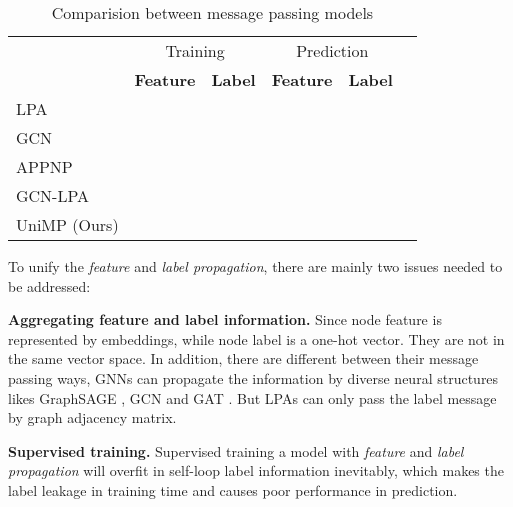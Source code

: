\documentclass{article} \usepackage{iclr2021_conference,times}
\begin{document}
\begin{table}[htbp]
	\setlength{\abovecaptionskip}{0.cm}
	\setlength{\belowcaptionskip}{-.2cm}
	\caption{Comparision between message passing models}
	\begin{center}
\begin{tabular}{lccccc}
			\multicolumn{1}{c}{ }  &\multicolumn{2}{c}{ Training} &\multicolumn{2}{c}{ Prediction} \\
			\multicolumn{1}{c}{ }  &\multicolumn{1}{c}{\bf Feature} &\multicolumn{1}{c}{\bf Label} &\multicolumn{1}{c}{\bf Feature} &\multicolumn{1}{c}{\bf Label}	\\
			\hline 
			LPA         & &\makecell[c]{\checkmark} & &\makecell[c]{\checkmark}   \\
			GCN             &\makecell[c]{\checkmark}  &&\makecell[c]{\checkmark}  & \\
			APPNP     &\makecell[c]{\checkmark}    &   &\makecell[c]{\checkmark}    & \\
			GCN-LPA      &\makecell[c]{\checkmark}    & \makecell[c]{\checkmark}    &\makecell[c]{\checkmark}    & \\
			UniMP (Ours)     &\makecell[c]{\checkmark}    & \makecell[c]{\checkmark}    &\makecell[c]{\checkmark}    &\makecell[c]{\checkmark}  \\
		\end{tabular}
	\end{center}
	\label{table:comparision}
	\vspace{-4mm}
\end{table}

To unify the \emph{feature} and \emph{label propagation}, there are mainly two issues needed to be addressed:

{\bf Aggregating feature and label information.} Since node feature is represented by embeddings, while node label is a one-hot vector. They are not in the same vector space. In addition, there are different between their message passing ways, GNNs can propagate the information by diverse neural structures likes GraphSAGE \citep{hamilton2017inductive}, GCN \citep{kipf2016semi} and GAT \citep{velivckovic2017graph}.  But LPAs can only pass the label message by graph adjacency matrix.

{\bf Supervised training.} Supervised training a model with \emph{feature} and \emph{label propagation} will overfit in self-loop label information inevitably, which makes the label leakage in training time and causes poor performance in prediction.
\end{document}
